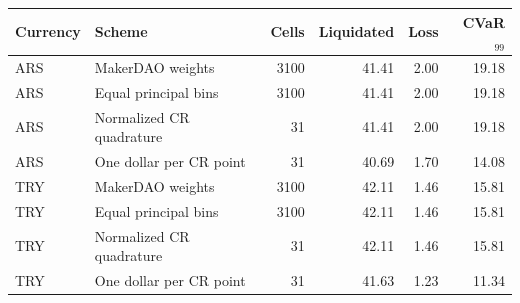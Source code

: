 \begin{tabular}{llrrrr}
\toprule
Currency & Scheme & Cells & Liquidated & Loss & CVaR$_{99}$ \\
\midrule
ARS & MakerDAO weights & 3100 & 41.41 & 2.00 & 19.18 \\
ARS & Equal principal bins & 3100 & 41.41 & 2.00 & 19.18 \\
ARS & Normalized CR quadrature & 31 & 41.41 & 2.00 & 19.18 \\
ARS & One dollar per CR point & 31 & 40.69 & 1.70 & 14.08 \\
TRY & MakerDAO weights & 3100 & 42.11 & 1.46 & 15.81 \\
TRY & Equal principal bins & 3100 & 42.11 & 1.46 & 15.81 \\
TRY & Normalized CR quadrature & 31 & 42.11 & 1.46 & 15.81 \\
TRY & One dollar per CR point & 31 & 41.63 & 1.23 & 11.34 \\
\bottomrule
\end{tabular}
